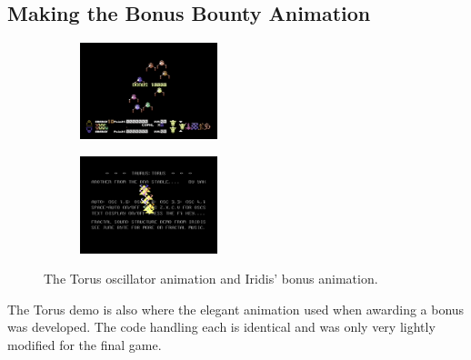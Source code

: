 \subsection{Making the Bonus Bounty Animation}
\begin{figure}[H]
{
  \setlength{\tabcolsep}{3.0pt}
  \setlength\cmidrulewidth{\heavyrulewidth} %
    \begin{adjustbox}{width=12cm,center}
  \begin{subfigure}{0.3\textwidth}
  \includegraphics[width=4cm]{torus/bonusbounty.png}%
  \end{subfigure}
  \begin{subfigure}{0.3\textwidth}
  \includegraphics[width=4cm]{torus/torus.png}%
  \end{subfigure}
  \end{adjustbox}
}\caption[]{The Torus oscillator animation and Iridis' bonus animation.}
\end{figure}

The Torus demo is also where the elegant animation used when awarding a bonus was developed. The code
handling each is identical and was only very lightly modified for the final game.

\begin{minipage}[b]{0.45\linewidth}
\centering
{}%

\end{minipage}
\hspace{0.5cm}
\begin{minipage}[b]{0.45\linewidth}
\centering
{}%

\end{minipage}


